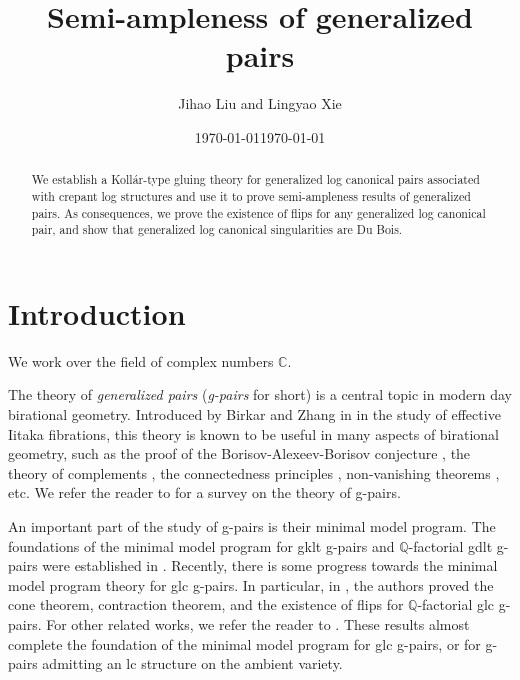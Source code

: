 \documentclass[11pt]{amsart}
\numberwithin{equation}{section}
\newcommand{\Qq}{\mathbb{Q}}
\theoremstyle{definition}
\theoremstyle{definition}
\theoremstyle{definition}
\begin{document}
\title{Semi-ampleness of generalized pairs}
\author{Jihao Liu and Lingyao Xie}

\address{Department of Mathematics, Northwestern University, 2033
Sheridan Rd, Evanston, IL 60208, USA}

\address{Department of Mathematics, The University of Utah, Salt Lake
City, UT 84112, USA}

\date{\today}

\date{\today}

\begin{abstract}
  We establish a Koll\'ar-type gluing theory for generalized log
  canonical pairs associated with crepant log structures and use it
  to prove semi-ampleness results of generalized pairs. As
  consequences, we prove the existence of flips for any generalized
  log canonical pair, and show that generalized log canonical
  singularities are Du Bois.
\end{abstract}

\maketitle
\tableofcontents

\section{Introduction}

We work over the field of complex numbers $\mathbb C$.

The theory of \emph{generalized pairs} (\emph{g-pairs} for short) is
a central topic in modern day birational geometry. Introduced by
Birkar and Zhang in \cite{BZ16} in the study of effective Iitaka
fibrations, this theory is known to be useful in many aspects of
birational geometry, such as the proof of the Borisov-Alexeev-Borisov
conjecture \cite{Bir19,Bir21a}, the theory of complements
\cite{Bir19,Sho20}, the connectedness principles \cite{Bir20,FS20},
non-vanishing theorems \cite{LPMTX22}, etc. We refer the reader to
\cite{Bir21b} for a survey on the theory of g-pairs.

An important part of the study of g-pairs is their minimal model
program. The foundations of the minimal model program for gklt
g-pairs and $\mathbb Q$-factorial gdlt g-pairs were established in
\cite{BZ16,HL22}. Recently, there is some progress towards the
minimal model program theory for glc g-pairs. In particular, in
\cite{HL21a}, the authors proved the cone theorem, contraction
theorem, and the existence of flips for $\Qq$-factorial glc g-pairs.
For other related works, we refer the reader to
\cite{Has20b,LT21,Has22,LX22}. These results almost complete the
foundation of the minimal model program for glc g-pairs, or for
g-pairs admitting an lc structure on the ambient variety.
\end{document}
